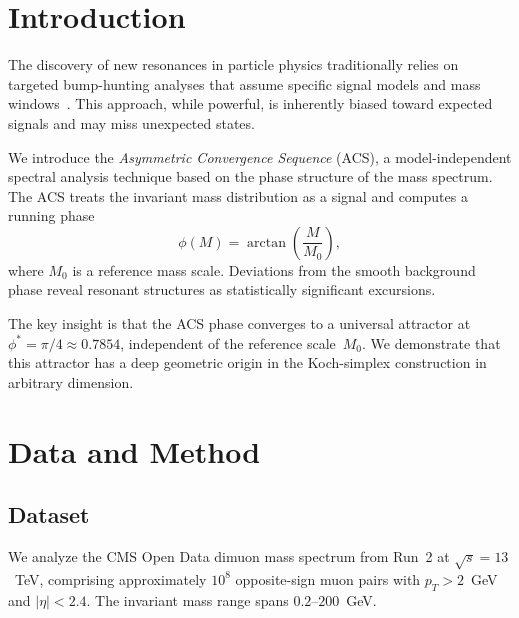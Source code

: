 \documentclass[twocolumn,showpacs,preprintnumbers,amsmath,amssymb,prl]{revtex4-2}
\begin{document}
\maketitle

\section{Introduction}

The discovery of new resonances in particle physics traditionally relies on
targeted bump-hunting analyses that assume specific signal models and mass
windows~\cite{PDG2024}. This approach, while powerful, is inherently biased
toward expected signals and may miss unexpected states.

We introduce the \emph{Asymmetric Convergence Sequence} (ACS), a
model-independent spectral analysis technique based on the phase structure
of the mass spectrum. The ACS treats the invariant mass distribution as a
signal and computes a running phase
\begin{equation}
    \phi(M) = \arctan\!\left(\frac{M}{M_0}\right),
    \label{eq:phase}
\end{equation}
where $M_0$ is a reference mass scale. Deviations from the smooth
background phase reveal resonant structures as statistically significant
excursions.

The key insight is that the ACS phase converges to a universal attractor at
$\phi^* = \pi/4 \approx 0.7854$, independent of the reference scale~$M_0$.
We demonstrate that this attractor has a deep geometric origin in the
Koch-simplex construction in arbitrary dimension.

\section{Data and Method}

\subsection{Dataset}

We analyze the CMS Open Data dimuon mass spectrum from Run~2 at
$\sqrt{s} = 13$~TeV, comprising approximately $10^8$ opposite-sign
muon pairs with $p_T > 2$~GeV and $|\eta| < 2.4$. The invariant
mass range spans $0.2$--$200$~GeV.
\end{document}
